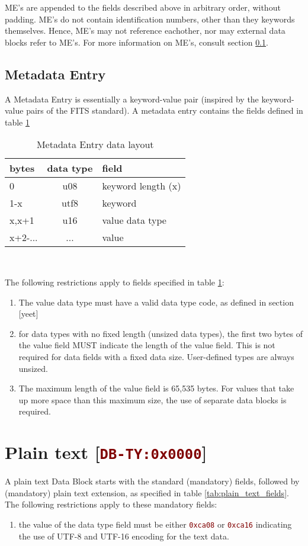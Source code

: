 \documentclass[pagesize=a4]{tufte-book}
\newcommand{\hlred}[1]{\textcolor{Maroon}{#1}}%
\newcommand{\hex}[1]{\hlred{\texttt{#1}}}%
\begin{document}
ME's are appended to the fields described above in arbitrary order, without padding. ME's do not contain identification numbers, other than they keywords themselves. Hence, ME's may not reference eachother, nor may external data blocks refer to ME's. For more information on ME's, consult section \ref{metadata_entry}.

\subsection{Metadata Entry}
\label{metadata_entry}
A Metadata Entry is essentially a keyword-value pair (inspired by the keyword-value pairs of the FITS standard). A metadata entry contains the fields defined in table \ref{tab:metadata_entry_fields}
\begin{table}[ht]
	\centering
	\selectfont
	\begin{tabular}{lcl}
		\toprule
		bytes & data type & field\\
		\midrule
		0 & u08 & keyword length (x)\\
		1-x & utf8 & keyword\\
		x,x+1 & u16 & value data type\\
		x+2-... & ... & value\\
		\bottomrule
	\end{tabular}
	~\label{tab:metadata_entry_fields}
	\caption{Metadata Entry data layout}	
\end{table}
\vspace{5mm}
The following restrictions apply to fields specified in table \ref{tab:metadata_entry_fields}:
\begin{enumerate}
	\item The value data type must have a valid data type code, as defined in section [yeet]
	\item for data types with no fixed length (unsized data types), the first two 
    bytes of the value field MUST indicate the length of the value field. This is not required for data fields with a fixed data size. User-defined types are always unsized.
    \item The maximum length of the value field is 65,535 bytes. For values that take
    up more space than this maximum size, the use of separate data blocks is required.
\end{enumerate}

\section{Plain text [\hex{DB-TY:0x0000}]}
\label{DBTY:0x0000}
A plain text Data Block starts with the standard (mandatory) fields, followed by (mandatory) plain text extension, as specified in table \ref{tab:plain_text_fields}. The following restrictions apply to these mandatory fields:
\begin{enumerate}
	\item the value of the data type field must be either \hex{0xca08} or \hex{0xca16} indicating the use of UTF-8 and UTF-16 encoding for the text data.
\end{enumerate}
\end{document}
